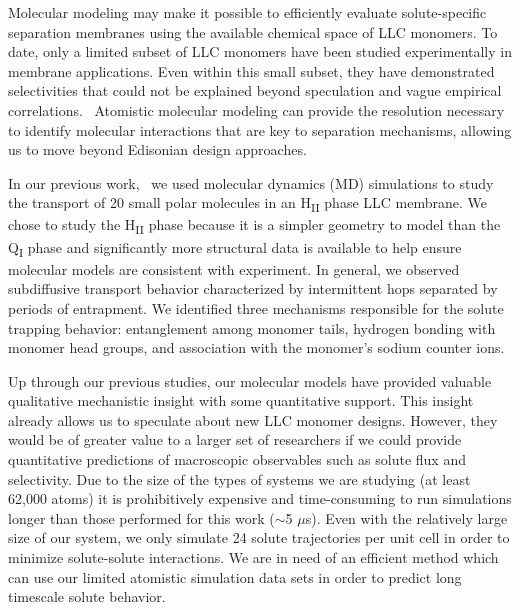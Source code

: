\documentclass[journal=ancac3,manuscript=article,layout=twocolumn]{achemso}
\begin{document}
  Molecular modeling may make it possible to efficiently evaluate
  solute-specific separation membranes using the available chemical space of
  LLC monomers. To date, only a limited subset of LLC monomers have been
  studied experimentally in membrane applications.
  \cite{carter_glycerol-based_2012,hatakeyama_nanoporous_2010,smith_ordered_1997,zhou_assembly_2003,resel_structural_2000}
  Even within this small subset, they have demonstrated selectivities that
  could not be explained beyond speculation and vague empirical
  correlations.~\cite{dischinger_application_2017} Atomistic molecular modeling
  can provide the resolution necessary to identify molecular interactions that
  are key to separation mechanisms, allowing us to move beyond Edisonian design
  approaches.

  In our previous work,~\cite{coscia_chemically_2019} we used molecular
  dynamics (MD) simulations to study the transport of 20 small polar molecules
  in an H\textsubscript{II} phase LLC membrane. We chose to study the
  H\textsubscript{II} phase because it is a simpler geometry to model than the
  Q\textsubscript{I} phase and significantly more structural data is available
  to help ensure molecular models are consistent with experiment. In general,
  we observed subdiffusive transport behavior characterized by intermittent
  hops separated by periods of entrapment. We identified three mechanisms
  responsible for the solute trapping behavior: entanglement among monomer
  tails, hydrogen bonding with monomer head groups, and association with the
  monomer's sodium counter ions.
  
  Up through our previous studies, our molecular models have provided valuable
  qualitative mechanistic insight with some quantitative support. This insight
  already allows us to speculate about new LLC monomer designs. However, they
  would be of greater value to a larger set of researchers if we could provide
  quantitative predictions of macroscopic observables such as solute flux and
  selectivity. Due to the size of the types of systems we are studying (at
  least 62,000 atoms) it is prohibitively expensive and time-consuming to run
  simulations longer than those performed for this work ($\sim$5 $\mu$s). Even
  with the relatively large size of our system, we only simulate 24 solute
  trajectories per unit cell in order to minimize solute-solute interactions.
  We are in need of an efficient method which can use our limited atomistic 
  simulation data sets in order to predict long timescale solute behavior.  
\end{document}

